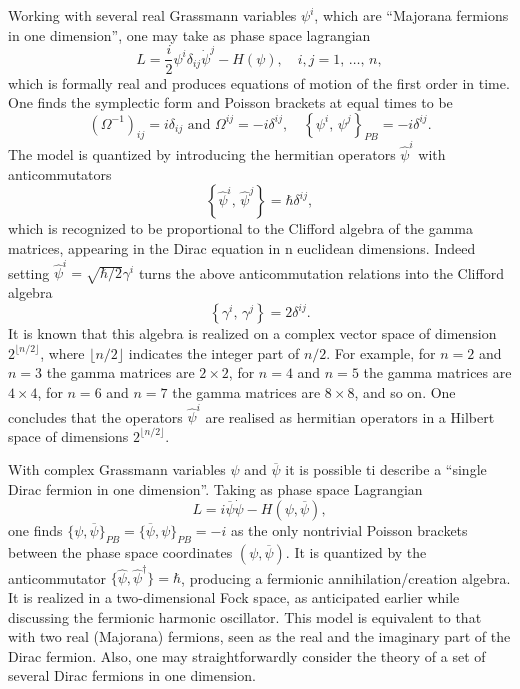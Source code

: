 \begin{example}
    Working with several real Grassmann variables \(\psi^i\), which are “Majorana fermions in one dimension”, one may take as phase space lagrangian
    \[
        L = \frac{i}{2} \psi^i \delta_{ij} \dot{\psi}^j - H(\psi),\quad i,j = 1,\,\dots,\,n,
    \]
    which is formally real and produces equations of motion of the first order in time. One finds the symplectic form and Poisson brackets at equal times to be
    \[
        (\Omega^{-1})_{ij} = i \delta_{ij} \text{ and } \Omega^{ij} = -i \delta^{ij}, \quad \left\{\psi^i,\,\psi^j\right\}_{PB} = -i \delta^{ij}.
    \]
    The model is quantized by introducing the hermitian operators \(\hat{\psi}^i\) with anticommutators
    \[
        \left\{\hat{\psi}^i,\,\hat{\psi}^j\right\} = \hbar \delta^{ij},
    \]
    which is recognized to be proportional to the Clifford algebra of the gamma matrices, appearing in the Dirac equation in n euclidean dimensions. Indeed setting \(\hat{\psi}^i = \sqrt{\hbar/2} \gamma^i\) turns the above anticommutation relations into the Clifford algebra
    \[
        \left\{\gamma^i,\,\gamma^j\right\} = 2 \delta^{ij}.
    \]
    It is known that this algebra is realized on a complex vector space of dimension \(2^{\lfloor n/2 \rfloor}\), where \(\lfloor n/2 \rfloor\) indicates the integer part of \(n/2\). For example, for \(n = 2\) and \(n = 3\) the gamma matrices are \(2 \times 2\), for \(n = 4\) and \(n = 5\) the gamma matrices are \(4 \times 4\), for \(n = 6\) and \(n = 7\) the gamma matrices are \(8 \times 8\), and so on. One concludes that the operators \(\hat{\psi}^i\) are realised as hermitian operators in a Hilbert space of dimensions \(2^{\lfloor n/2 \rfloor}\).
\end{example}

\begin{example}
    With complex Grassmann variables \(\psi\) and \(\overline{\psi}\) it is possible ti describe a “single Dirac fermion in one dimension”. Taking as phase space Lagrangian
    \[
        L = i \overline{\psi} \dot{\psi} - H(\psi, \overline{\psi}),
    \]
    one finds \(\{\psi, \overline{\psi}\}_{PB} = \{\overline{\psi}, \psi\}_{PB} = -i\) as the only nontrivial Poisson brackets between the phase space coordinates \((\psi, \overline{\psi})\). It is quantized by the anticommutator \(\{\hat{\psi}, \hat{\psi}^\dagger\} = \hbar\), producing a fermionic annihilation/creation algebra. It is realized in a two-dimensional Fock space, as anticipated earlier while discussing the fermionic harmonic oscillator. This model is equivalent to that with two real (Majorana) fermions, seen as the real and the imaginary part of the Dirac fermion. Also, one may straightforwardly consider the theory of a set of several Dirac fermions in one dimension.
\end{example}

